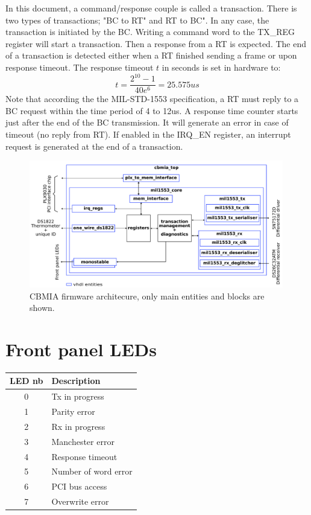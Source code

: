 \documentclass[11pt,a4paper]{article}
\begin{document}
In this document, a command/response couple is called a transaction.
There is two types of transactions; "BC to RT" and RT to BC".
In any case, the transaction is initiated by the BC.
Writing a command word to the TX\_REG register will start a transaction.
Then a response from a RT is expected.
The end of a transaction is detected either when a RT finished sending a frame or upon response timeout.
The response timeout $t$ in seconds is set in hardware to:
\[
t = \frac{2^{10}-1}{40e^6} = 25.575us
\]
Note that according the the MIL-STD-1553 specification, a RT must reply to a BC request within the time period of 4 to 12us.
A response time counter starts just after the end of the BC transmission. It will generate an error in case of timeout (no reply from RT).
If enabled in the IRQ\_EN register, an interrupt request is generated at the end of a transaction.

\begin{figure}[h]
  \centering
  \includegraphics[width=0.99\textwidth]{figures/firmware_arch.pdf}
  \caption{CBMIA firmware architecure, only main entities and blocks are shown.}
  \label{fig:firmware_arch}
\end{figure}


\newpage
\section{Front panel LEDs}

\begin{table}[h!]
  \centering
  \begin{tabular}{ c l }
    \hline
    \textbf{LED nb} & \textbf{Description}\\
    \hline
    0 & Tx in progress \\
    1 & Parity error \\
    2 & Rx in progress \\
    3 & Manchester error \\
    4 & Response timeout \\
    5 & Number of word error \\
    6 & PCI bus access \\
    7 & Overwrite error \footnotemark \\
    \hline
  \end{tabular}
\end{table}
\end{document}
